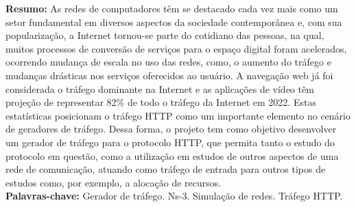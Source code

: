 \begin{singlespace}
\textbf{Resumo: }
As redes de computadores têm se destacado cada vez mais como um setor fundamental em diversos aspectos da sociedade contemporânea e, com sua popularização, a Internet tornou-se parte do cotidiano das pessoas, na qual, muitos processos de conversão de serviços para o espaço digital foram acelerados, ocorrendo mudança de escala no uso das redes, como, o aumento do tráfego e mudanças drásticas nos serviços oferecidos ao usuário. A navegação web já foi considerada o tráfego dominante na Internet e as aplicações de vídeo têm projeção de representar 82\% de todo o tráfego da Internet em 2022. Estas estatísticas posicionam o tráfego HTTP como um importante elemento no cenário de geradores de tráfego. Dessa forma, o projeto tem como objetivo desenvolver um gerador de tráfego para o protocolo HTTP, que permita tanto o estudo do protocolo em questão, como a utilização em estudos de outros aspectos de uma rede de comunicação, atuando como tráfego de entrada para outros tipos de estudos como, por exemplo, a alocação de recursos.\\
\textbf{Palavras-chave: }
Gerador de tráfego. Ns-3. Simulação de redes. Tráfego HTTP.
\end{singlespace}
